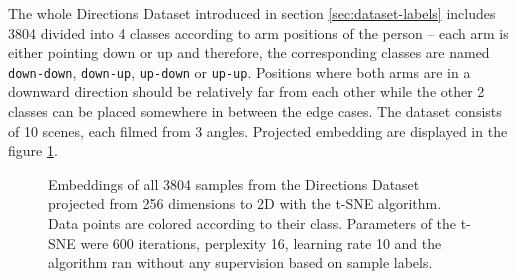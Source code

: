 The whole Directions Dataset introduced in section \ref{sec:dataset-labels} includes 3804 divided into 4 classes according to arm positions of the person -- each arm is either pointing down or up and therefore, the corresponding classes are named \texttt{down-down}, \texttt{down-up}, \texttt{up-down} or \texttt{up-up}. Positions where both arms are in a downward direction should be relatively far from each other while the other 2 classes can be placed somewhere in between the edge cases. The dataset consists of 10 scenes, each filmed from 3 angles. Projected embedding are displayed in the figure \ref{fig:t-sne}.

\begin{figure}[!ht]
    \centering
    \caption{Embeddings of all 3804 samples from the Directions Dataset projected from 256 dimensions to 2D with the t-SNE algorithm. Data points are colored according to their class. Parameters of the t-SNE were 600 iterations, perplexity 16, learning rate 10 and the algorithm ran without any supervision based on sample labels.}
    \label{fig:t-sne}
\end{figure}

